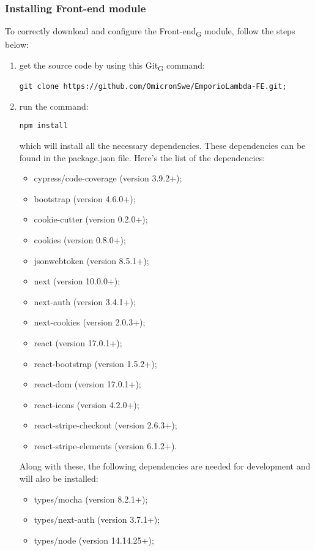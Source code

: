 \subsubsection{Installing Front-end module}
To correctly download and configure the Front-end\textsubscript{G} module, follow the steps below:
\begin{enumerate}
\item get the source code by using this Git\textsubscript{G} command:\begin{center}\texttt{git clone https://github.com/OmicronSwe/EmporioLambda-FE.git;}\end{center}
\item run the command:\begin{center}\texttt{npm install}\end{center}which will install all the necessary dependencies. These dependencies can be found in the package.json file.\newline{} Here's the list of the dependencies:
\begin{itemize}
\item cypress/code-coverage (version 3.9.2+);
\item bootstrap (version 4.6.0+);
\item cookie-cutter (version 0.2.0+);
\item cookies (version 0.8.0+);
\item jsonwebtoken (version 8.5.1+);
\item next (version 10.0.0+);
\item next-auth (version 3.4.1+);
\item next-cookies (version 2.0.3+);
\item react (version 17.0.1+);
\item react-bootstrap (version 1.5.2+);
\item react-dom (version 17.0.1+);
\item react-icons (version 4.2.0+);
\item react-stripe-checkout (version 2.6.3+);
\item react-stripe-elements (version 6.1.2+).
\end{itemize}
Along with these, the following dependencies are needed for development and will also be installed:
\begin{itemize}
\item types/mocha (version 8.2.1+);
\item types/next-auth (version 3.7.1+);
\item types/node (version 14.14.25+);

\end{itemize}
\end{enumerate}
